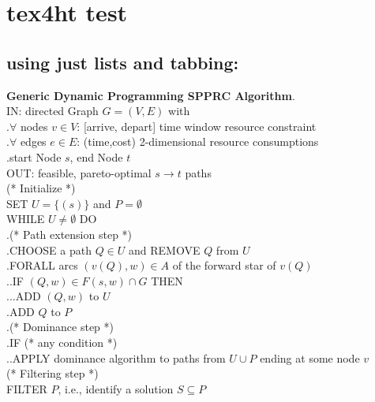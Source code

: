 \documentclass[a4paper,11pt]{article}
\newcommand{\tab}{{\color{white}.\hspace{1 cm}}}
\begin{document}
\section{tex4ht test}
\subsection{using just lists and tabbing:}
\textbf{Generic Dynamic Programming SPPRC Algorithm}\tab\\
IN: directed Graph $G=(V,E)$ with \\
\tab $\forall$ nodes $v \in V$: [arrive, depart] time window resource constraint \\
\tab $\forall$ edges $e \in E$: (time,cost) 2-dimensional resource consumptions \\
\tab start Node $s$, end Node $t$\\
OUT: feasible, pareto-optimal $s \rightarrow t$ paths \\
(* Initialize *) \\
SET $U = \{(s)\}$ and $P = \emptyset$ \\
WHILE ${U} \neq \emptyset$ DO \\
\tab	(* Path extension step *)\\
\tab	CHOOSE a path ${Q} \in {U}$ and REMOVE ${Q}$ from ${U}$\\
\tab	FORALL arcs $(v({Q}), w) \in A$ of the forward star of $v({Q})$ \\
\tab\tab	IF $({Q},w) \in {F}(s,w) \cap {G}$ THEN \\
\tab\tab\tab		ADD $({Q},w)$ to ${U}$ \\
\tab	ADD ${Q}$ to ${P}$ \\
\tab	(* Dominance step *)\\
\tab	IF (* any condition *) \\
\tab\tab	APPLY dominance algorithm to paths from ${U} \cup {P}$ ending at some node $v$\\
(* Filtering step *)\\
FILTER ${P}$, i.e., identify a solution ${S} \subseteq {P}$\\

\newpage
\end{document}
